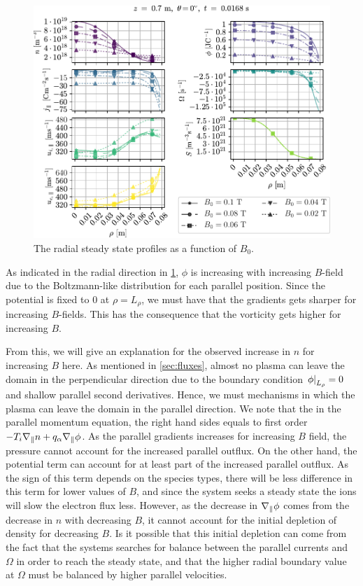%
\begin{figure}[htb]
    \centering
    \includegraphics{fig/results/bScan/BScanRad}
    \caption{The radial steady state profiles as a function of $B_0$.}
    \label{fig:BScanRad}
\end{figure}
%
As indicated in the radial direction in \cref{fig:BScanRad}, $\phi$ is increasing with increasing $B$-field due to the Boltzmann-like distribution for each parallel position.
Since the potential is fixed to $0$ at $\rho = L_\rho$, we must have that the gradients gets sharper for increasing $B$-fields.
This has the consequence that the vorticity gets higher for increasing $B$.

From this, we will give an explanation for the observed increase in $n$ for increasing $B$ here.
As mentioned in \cref{sec:fluxes}, almost no plasma can leave the domain in the perpendicular direction due to the boundary condition $\left.\phi\right|_{L_\rho}=0$ and shallow parallel second derivatives.
Hence, we must mechanisms in which the plasma can leave the domain in the parallel direction.
We note that the in the parallel momentum equation, the right hand sides equals to first order $-T_i \nabla_\| n + q_\alpha \nabla_\| \phi$.
As the parallel gradients increases for increasing $B$ field, the pressure cannot account for the increased parallel outflux.
On the other hand, the potential term can account for at least part of the increased parallel outflux.
As the sign of this term depends on the species types, there will be less difference in this term for lower values of $B$, and since the system seeks a steady state the ions will slow the electron flux less.
However, as the decrease in $\nabla_\| \phi$ comes from the decrease in $n$ with decreasing $B$, it cannot account for the initial depletion of density for decreasing $B$.
Is it possible that this initial depletion can come from the fact that the systems searches for balance between the parallel currents and $\Omega$ in order to reach the steady state, and that the higher radial boundary value at $\Omega$ must be balanced by higher parallel velocities.

